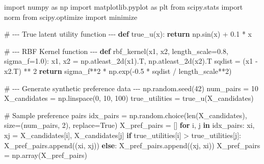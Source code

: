\documentclass[
  letterpaper,
  numbers=noenddot,
  DIV=11]{scrreprt}
\newenvironment{Shaded}{\begin{snugshade}}{\end{snugshade}}
\newcommand{\BuiltInTok}[1]{\textcolor[rgb]{0.00,0.23,0.31}{#1}}
\newcommand{\CommentTok}[1]{\textcolor[rgb]{0.37,0.37,0.37}{#1}}
\newcommand{\ControlFlowTok}[1]{\textcolor[rgb]{0.00,0.23,0.31}{\textbf{#1}}}
\newcommand{\DecValTok}[1]{\textcolor[rgb]{0.68,0.00,0.00}{#1}}
\newcommand{\FloatTok}[1]{\textcolor[rgb]{0.68,0.00,0.00}{#1}}
\newcommand{\ImportTok}[1]{\textcolor[rgb]{0.00,0.46,0.62}{#1}}
\newcommand{\KeywordTok}[1]{\textcolor[rgb]{0.00,0.23,0.31}{\textbf{#1}}}
\newcommand{\NormalTok}[1]{\textcolor[rgb]{0.00,0.23,0.31}{#1}}
\newcommand{\OperatorTok}[1]{\textcolor[rgb]{0.37,0.37,0.37}{#1}}
\newcommand{\VariableTok}[1]{\textcolor[rgb]{0.07,0.07,0.07}{#1}}
\theoremstyle{plain}
\theoremstyle{definition}
\theoremstyle{remark}
\begin{document}
\begin{Shaded}
\begin{Highlighting}[numbers=left,,]
\ImportTok{import}\NormalTok{ numpy }\ImportTok{as}\NormalTok{ np}
\ImportTok{import}\NormalTok{ matplotlib.pyplot }\ImportTok{as}\NormalTok{ plt}
\ImportTok{from}\NormalTok{ scipy.stats }\ImportTok{import}\NormalTok{ norm}
\ImportTok{from}\NormalTok{ scipy.optimize }\ImportTok{import}\NormalTok{ minimize}

\CommentTok{\# {-}{-}{-} True latent utility function {-}{-}{-}}
\KeywordTok{def}\NormalTok{ true\_u(x):}
    \ControlFlowTok{return}\NormalTok{ np.sin(x) }\OperatorTok{+} \FloatTok{0.1} \OperatorTok{*}\NormalTok{ x}

\CommentTok{\# {-}{-}{-} RBF Kernel function {-}{-}{-}}
\KeywordTok{def}\NormalTok{ rbf\_kernel(x1, x2, length\_scale}\OperatorTok{=}\FloatTok{0.8}\NormalTok{, sigma\_f}\OperatorTok{=}\FloatTok{1.0}\NormalTok{):}
\NormalTok{    x1, x2 }\OperatorTok{=}\NormalTok{ np.atleast\_2d(x1).T, np.atleast\_2d(x2).T}
\NormalTok{    sqdist }\OperatorTok{=}\NormalTok{ (x1 }\OperatorTok{{-}}\NormalTok{ x2.T) }\OperatorTok{**} \DecValTok{2}
    \ControlFlowTok{return}\NormalTok{ sigma\_f}\OperatorTok{**}\DecValTok{2} \OperatorTok{*}\NormalTok{ np.exp(}\OperatorTok{{-}}\FloatTok{0.5} \OperatorTok{*}\NormalTok{ sqdist }\OperatorTok{/}\NormalTok{ length\_scale}\OperatorTok{**}\DecValTok{2}\NormalTok{)}

\CommentTok{\# {-}{-}{-} Generate synthetic preference data {-}{-}{-}}
\NormalTok{np.random.seed(}\DecValTok{42}\NormalTok{)}
\NormalTok{num\_pairs }\OperatorTok{=} \DecValTok{10}
\NormalTok{X\_candidates }\OperatorTok{=}\NormalTok{ np.linspace(}\DecValTok{0}\NormalTok{, }\DecValTok{10}\NormalTok{, }\DecValTok{100}\NormalTok{)}
\NormalTok{true\_utilities }\OperatorTok{=}\NormalTok{ true\_u(X\_candidates)}

\CommentTok{\# Sample preference pairs}
\NormalTok{idx\_pairs }\OperatorTok{=}\NormalTok{ np.random.choice(}\BuiltInTok{len}\NormalTok{(X\_candidates), size}\OperatorTok{=}\NormalTok{(num\_pairs, }\DecValTok{2}\NormalTok{), replace}\OperatorTok{=}\VariableTok{True}\NormalTok{)}
\NormalTok{X\_pref\_pairs }\OperatorTok{=}\NormalTok{ []}
\ControlFlowTok{for}\NormalTok{ i, j }\KeywordTok{in}\NormalTok{ idx\_pairs:}
\NormalTok{    xi, xj }\OperatorTok{=}\NormalTok{ X\_candidates[i], X\_candidates[j]}
    \ControlFlowTok{if}\NormalTok{ true\_utilities[i] }\OperatorTok{\textgreater{}}\NormalTok{ true\_utilities[j]:}
\NormalTok{        X\_pref\_pairs.append((xi, xj))}
    \ControlFlowTok{else}\NormalTok{:}
\NormalTok{        X\_pref\_pairs.append((xj, xi))}
\NormalTok{X\_pref\_pairs }\OperatorTok{=}\NormalTok{ np.array(X\_pref\_pairs)}


\end{Highlighting}
\end{Shaded}
\end{document}
